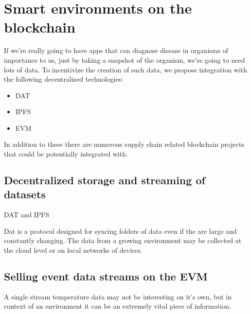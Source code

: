 
\section{Smart environments on the blockchain}

If we're really going to have apps that can diagnose disease in organisms of importance to us, just by taking a snapshot of the organism, we're going to need lots of data. To incentivize the creation of such data, we propose integration with the following decentralized technologies:

\begin{itemize}
    \item DAT
    \item IPFS
    \item EVM
\end{itemize}

In addition to these there are numerous supply chain related blockchain projects that could be potentially integrated with.

\subsection{Decentralized storage and streaming of datasets}
DAT and IPFS

Dat is a protocol designed for syncing folders of data even if the are large and constantly changing. The data from a growing environment may be collected at the cloud level or on local networks of devices.

\subsection{}

\subsection{Selling event data streams on the EVM}
A single stream temperature data may not be interesting on it's own, but in context of an environment it can be an extremely vital piece of information.




